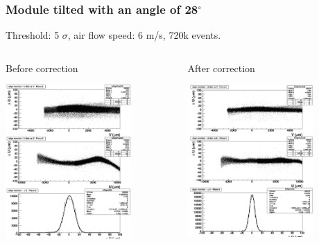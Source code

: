 \documentclass{beamer}
\newcommand{\degres}{\ensuremath{^\circ}}
\begin{document}
\begin{frame}
  \frametitle{Module tilted with an angle of 28\degres}

  \vspace{-0.35cm}
  Threshold: 5 $\sigma$, air flow speed: 6 m/s, 720k events.

  \vspace{-0.35cm}
  \begin{columns}[c]
    \begin{column}{5cm}
      \begin{block}{Before correction}
        \begin{center}
          \includegraphics[width = 4.8cm]{Pictures/RsAlign_226021_pl6_deformed2.png}
        \end{center}

        \vspace{-0.54cm}
      \end{block}
    \end{column}

    \begin{column}{5cm}
      \begin{block}{After correction}
        \begin{center}
          \includegraphics[width = 4.8cm]{Pictures/RsAlign_226021_pl6_corrected2.png}
        \end{center}

        \vspace{-0.52cm}
      \end{block}
    \end{column}
  \end{columns}

\end{frame}
\end{document}
